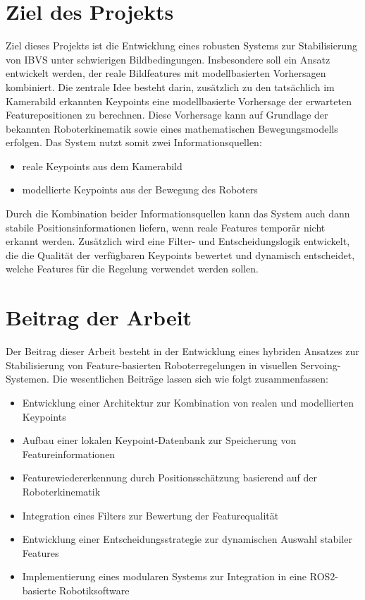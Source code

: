 \section{Ziel des Projekts}
\label{sec:ZieldesProjekts}
Ziel dieses Projekts ist die Entwicklung eines robusten Systems zur Stabilisierung von \ac{IBVS} unter schwierigen Bildbedingungen. Insbesondere soll ein Ansatz entwickelt werden, der reale Bildfeatures mit modellbasierten Vorhersagen kombiniert.
Die zentrale Idee besteht darin, zusätzlich zu den tatsächlich im Kamerabild erkannten Keypoints eine modellbasierte Vorhersage der erwarteten Featurepositionen zu berechnen. Diese Vorhersage kann auf Grundlage der bekannten Roboterkinematik sowie eines mathematischen Bewegungsmodells erfolgen.
Das System nutzt somit zwei Informationsquellen:
\begin{itemize}
	\item reale Keypoints aus dem Kamerabild
	\item modellierte Keypoints aus der Bewegung des Roboters
\end{itemize}

Durch die Kombination beider Informationsquellen kann das System auch dann stabile Positionsinformationen liefern, wenn reale Features temporär nicht erkannt werden.
Zusätzlich wird eine Filter- und Entscheidungslogik entwickelt, die die Qualität der verfügbaren Keypoints bewertet und dynamisch entscheidet, welche Features für die Regelung verwendet werden sollen.

\section{Beitrag der Arbeit}
\label{sec:BeitragderArbeit}
Der Beitrag dieser Arbeit besteht in der Entwicklung eines hybriden Ansatzes zur Stabilisierung von Feature-basierten Roboterregelungen in visuellen Servoing-Systemen.
Die wesentlichen Beiträge lassen sich wie folgt zusammenfassen:
\begin{itemize}
	\item Entwicklung einer Architektur zur Kombination von realen und modellierten Keypoints
	\item Aufbau einer lokalen Keypoint-Datenbank zur Speicherung von Featureinformationen
	\item Featurewiedererkennung durch Positionsschätzung basierend auf der Roboterkinematik
	\item Integration eines Filters zur Bewertung der Featurequalität
	\item Entwicklung einer Entscheidungsstrategie zur dynamischen Auswahl stabiler Features
	\item Implementierung eines modularen Systems zur Integration in eine \ac{ROS2}-basierte Robotiksoftware
\end{itemize}

